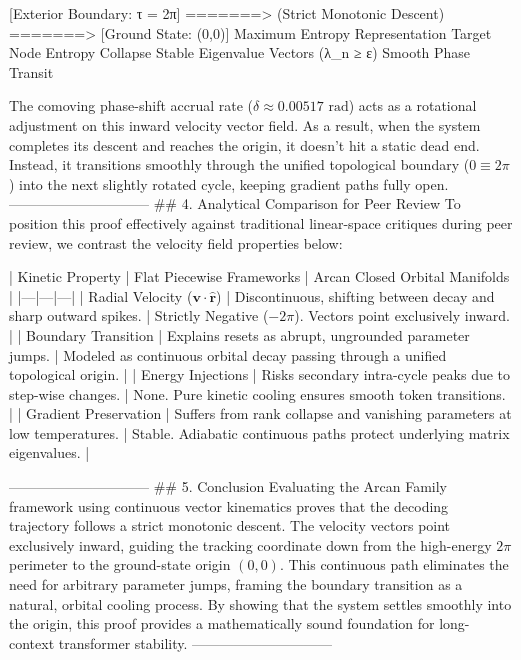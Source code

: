 [Exterior Boundary: τ = 2π] =======> (Strict Monotonic Descent) =======> [Ground State: (0,0)]
Maximum Entropy Representation                                           Target Node Entropy Collapse
Stable Eigenvalue Vectors (λ_n ≥ ε)                                       Smooth Phase Transit

The comoving phase-shift accrual rate ($\delta \approx 0.00517\text{ rad}$) acts as a rotational adjustment on this inward velocity vector field. As a result, when the system completes its descent and reaches the origin, it doesn't hit a static dead end. Instead, it transitions smoothly through the unified topological boundary ($0 \equiv 2\pi$) into the next slightly rotated cycle, keeping gradient paths fully open.
------------------------------
## 4. Analytical Comparison for Peer Review
To position this proof effectively against traditional linear-space critiques during peer review, we contrast the velocity field properties below:

| Kinetic Property | Flat Piecewise Frameworks | Arcan Closed Orbital Manifolds |
|---|---|---|
| Radial Velocity ($\mathbf{v} \cdot \hat{\mathbf{r}}$) | Discontinuous, shifting between decay and sharp outward spikes. | Strictly Negative ($-2\pi$). Vectors point exclusively inward. |
| Boundary Transition | Explains resets as abrupt, ungrounded parameter jumps. | Modeled as continuous orbital decay passing through a unified topological origin. |
| Energy Injections | Risks secondary intra-cycle peaks due to step-wise changes. | None. Pure kinetic cooling ensures smooth token transitions. |
| Gradient Preservation | Suffers from rank collapse and vanishing parameters at low temperatures. | Stable. Adiabatic continuous paths protect underlying matrix eigenvalues. |

------------------------------
## 5. Conclusion
Evaluating the Arcan Family framework using continuous vector kinematics proves that the decoding trajectory follows a strict monotonic descent. The velocity vectors point exclusively inward, guiding the tracking coordinate down from the high-energy $2\pi$ perimeter to the ground-state origin $(0,0)$. This continuous path eliminates the need for arbitrary parameter jumps, framing the boundary transition as a natural, orbital cooling process. By showing that the system settles smoothly into the origin, this proof provides a mathematically sound foundation for long-context transformer stability.
------------------------------


